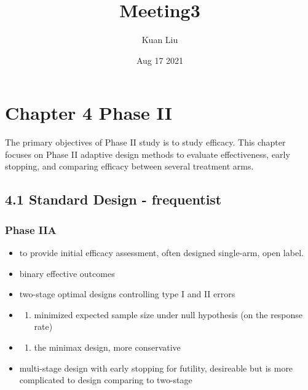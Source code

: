 \documentclass[
]{article}
\title{Meeting3}
\author{Kuan Liu}
\date{Aug 17 2021}
\providecommand{\tightlist}{%
  \setlength{\itemsep}{0pt}\setlength{\parskip}{0pt}}
\begin{document}
\maketitle

\hypertarget{chapter-4-phase-ii}{%
\section{Chapter 4 Phase II}\label{chapter-4-phase-ii}}

The primary objectives of Phase II study is to study efficacy. This
chapter focuses on Phase II adaptive design methods to evaluate
effectiveness, early stopping, and comparing efficacy between several
treatment arms.

\hypertarget{standard-design---frequentist}{%
\subsection{4.1 Standard Design -
frequentist}\label{standard-design---frequentist}}

\hypertarget{phase-iia}{%
\subsubsection{Phase IIA}\label{phase-iia}}

\begin{itemize}
\item
  to provide initial efficacy assessment, often designed single-arm,
  open label.
\item
  binary effective outcomes
\item
  two-stage optimal designs controlling type I and II errors
\item
  \begin{enumerate}
  \def\labelenumi{\alph{enumi})}
  \tightlist
  \item
    minimized expected sample size under null hypothesis (on the
    response rate)
  \end{enumerate}
\item
  \begin{enumerate}
  \def\labelenumi{\alph{enumi})}
  \setcounter{enumi}{1}
  \tightlist
  \item
    the minimax design, more conservative
  \end{enumerate}
\item
  multi-stage design with early stopping for futility, desireable but is
  more complicated to design comparing to two-stage
\end{itemize}
\end{document}
